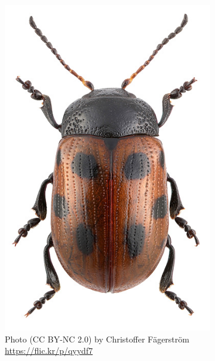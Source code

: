 \documentclass[letterpaper, 11pt]{article}
\begin{document}
\begin{figure}[ht!]
\begin{subfigure}[ht!]{0.23\textwidth}
    \includegraphics[width=\textwidth]{Chrysomelid2}
  \caption{Photo (CC BY-NC 2.0) by Christoffer F\"{a}gerstr\"{o}m  \url{https://flic.kr/p/qyydf7}}
  \label{fig:chrysomelid2}
\end{subfigure}
    ~
\begin{subfigure}[ht!]{0.23\textwidth}

\end{subfigure}
\end{figure}
\end{document}
